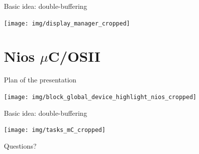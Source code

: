 \documentclass[10pt]{beamer}
\begin{document}
\begin{frame}{Basic idea: double-buffering}
    \begin{center}
        \texttt{[image: img/display\_manager\_cropped]}
    \end{center}
\end{frame}

\section{Nios $\mu$C/OSII}
\begin{frame}{Plan of the presentation}
    \begin{center}
        \texttt{[image: img/block\_global\_device\_highlight\_nios\_cropped]}
    \end{center}
\end{frame}

\begin{frame}{Basic idea: double-buffering}
    \begin{center}
        \texttt{[image: img/tasks\_mC\_cropped]}
    \end{center}
\end{frame}

\begin{frame}[standout]
    Questions?
\end{frame}

\appendix

%  	
%  	
\end{document}
